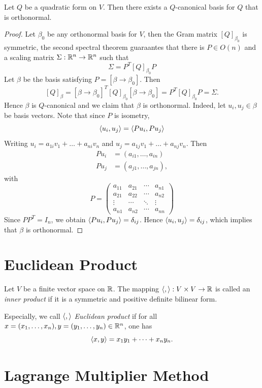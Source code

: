 ﻿\documentclass[12pt]{article}
\begin{document}
\begin{proposition}
    Let $Q$ be a quadratic form on $V$. Then there exists a $Q$-canonical basis for $Q$ that is orthonormal.
\end{proposition}
\begin{proof}
    Let $\beta_0$ be any orthonormal basis for $V$, then the Gram matrix $[Q]_{\beta_0}$ is symmetric, the second spectral theorem guaraantes that there is $P \in O(n)$ and a scaling matrix $\Sigma: \mathbb{R}^n \to \mathbb{R}^n$ such that 
    \[
        \Sigma = P^T [Q]_{\beta_0}P
    \]
    Let $\beta$ be the basis satisfying $P = [\beta \to \beta_0]$. Then 
    \[
        [Q]_{\beta} = [\beta \to \beta_0]^T [Q]_{\beta_0}[\beta \to \beta_0] = P^T[Q]_{\beta_0}P = \Sigma.
    \]
    Hence $\beta$ is $Q$-canonical and we claim that $\beta$ is orthonormal. Indeed, let $u_i, u_j \in \beta$ be basis vectors. Note that since $P$ is isometry,
    \[
        \left\langle u_i,u_j \right\rangle = \left\langle P u_i, Pu_j \right\rangle
    \]
    Writing $u_i = a_{1i}v_1 + \dots + a_{ni}v_n$ and $u_j = a_{1j}v_1 + \dots + a_{nj}v_n$. Then 
    \begin{align*}
        Pu_i &= (a_{i1},\dots, a_{in})\\
        Pu_j &= (a_{j1},\dots, a_{jn}),
    \end{align*}
    with 
    \[
        P = \begin{pmatrix}
            a_{11} & a_{21}&\cdots &a_{n1}\\
            a_{21} & a_{22} & \cdots & a_{n2}\\
            \vdots & \cdots & \ddots & \vdots \\
            a_{n1} & a_{n2} & \cdots & a_{nn}
        \end{pmatrix}
    \]
    Since $PP^T = I_n$, we obtain $\left\langle P u_i, Pu_j \right\rangle = \delta_{ij}$. Hence $\left\langle u_i,u_j \right\rangle = \delta_{ij}$, which implies that $\beta$ is orthonormal.
\end{proof}
\section{Euclidean Product}
\begin{definition}
    Let $V$ be a finite vector space on $\mathbb{R}$. The mapping $\left\langle , \right\rangle:V \times V \to \mathbb{R}$
    is called an \textit{inner product} if it is a symmetric and positive definite bilinear form. 
    
    Especially, we call $\left\langle , \right\rangle$ \textit{Euclidean product} if for all $x = (x_1,\dots, x_n), y = (y_1,\dots, y_n) \in \mathbb{R}^n$, one has 
    \[
        \left\langle x,y \right\rangle = x_1y_1 + \dots + x_ny_n.
    \]
\end{definition}
\section{Lagrange Multiplier Method}
\end{document}
